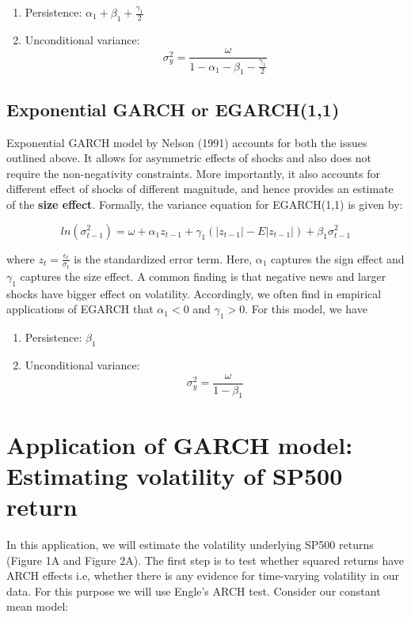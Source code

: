 \documentclass[]{book}
\theoremstyle{definition}
\theoremstyle{definition}
\theoremstyle{definition}
\theoremstyle{remark}
\begin{document}
\begin{enumerate}
\def\labelenumi{\arabic{enumi}.}
\item
  Persistence: \(\alpha_1+\beta_1 +\frac{\gamma_1}{2}\)
\item
  Unconditional variance: \[\sigma^2_y = \frac{\omega}{1-\alpha_1-\beta_1-\frac{\gamma_1}{2}}\]
\end{enumerate}

\hypertarget{exponential-garch-or-egarch11}{%
\subsection{Exponential GARCH or EGARCH(1,1)}\label{exponential-garch-or-egarch11}}

Exponential GARCH model by Nelson (1991) accounts for both the issues outlined above. It allows for asymmetric effects of shocks and also does not require the non-negativity constraints. More importantly, it also accounts for different effect of shocks of different magnitude, and hence provides an estimate of the \textbf{size effect}. Formally, the variance equation for EGARCH(1,1) is given by:

\[ln(\sigma^2_{t-1})=\omega+ \alpha_1 z_{t-1} +\gamma_1 (|z_{t-1}|-E|z_{t-1}|) +\beta_1\sigma^2_{t-1}\]

where \(z_t=\frac{\epsilon_t}{\sigma_t}\) is the standardized error term. Here, \(\alpha_1\) captures the sign effect and \(\gamma_1\) captures the size effect. A common finding is that negative news and larger shocks have bigger effect on volatility. Accordingly, we often find in empirical applications of EGARCH that \(\alpha_1<0\) and \(\gamma_1>0\). For this model, we have

\begin{enumerate}
\def\labelenumi{\arabic{enumi}.}
\item
  Persistence: \(\beta_1\)
\item
  Unconditional variance: \[\sigma^2_y = \frac{\omega}{1-\beta_1}\]
\end{enumerate}

\hypertarget{application-of-garch-model-estimating-volatility-of-sp500-return}{%
\section{Application of GARCH model: Estimating volatility of SP500 return}\label{application-of-garch-model-estimating-volatility-of-sp500-return}}

In this application, we will estimate the volatility underlying SP500 returns (Figure 1A and Figure 2A). The first step is to test whether squared returns have ARCH effects i.e, whether there is any evidence for time-varying volatility in our data. For this purpose we will use Engle's ARCH test. Consider our constant mean model:
\end{document}
